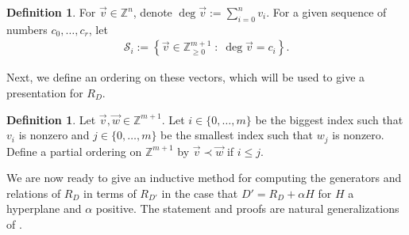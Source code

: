 \documentclass{amsart}
\theoremstyle{plain}
\theoremstyle{definition}
\newtheorem{defn}[thm]{Definition}
\theoremstyle{remark}
\numberwithin{equation}{section}
\newcommand\bz{{\mathbb Z}}
\newcommand\mss{\mathscr{S}}
\begin{document}
\begin{defn}
\label{defn:vec-sum}
For $\vec{v} \in \bz^n$, denote $\deg \vec{v} := \sum_{i = 0}
^n v_i$.
For a given sequence of numbers $c_0, \ldots, c_r$, let 
\begin{align*}
	\mss_i := \left \{\vec{v} \in \bz_{\geq 0}^{m + 1} \; : \;
\deg \vec v = c_i \right\}.	
\end{align*}

\noindent
\end{defn}

Next, we define an ordering on these vectors, which will be used to
give a presentation for $R_D$.

\begin{defn}
\label{defn:vec-order}
Let $\vec{v}, \vec{w} \in \bz^{m+1}$. Let $i \in \{0,\ldots, m\}$
be the biggest index such that $v_i$ is nonzero
and $j \in \{0,\ldots, m\}$ be the smallest index such that $w_j$ is
nonzero. Define a partial ordering
on $\bz^{m+1}$ by $\vec{v} \prec \vec{w}$ if $i \leq j$.
\end{defn}

We are now ready to give an inductive method for computing
the generators and relations of $R_D$ in terms of $R_{D'}$ 
in the case that $D' = R_D + \alpha H$ for $H$ a hyperplane and
$\alpha$ positive.
The statement and proofs are natural generalizations of
\cite[Theorem 6]{dorney:canonical}.
\end{document}
